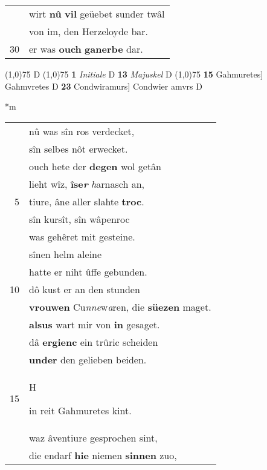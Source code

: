 \documentclass[8pt,a4paper,notitlepage]{article}
\begin{document}
\begin{table}[ht]
\begin{minipage}[t]{0.5\linewidth}
\begin{tabular}{rl}
 & wirt \textbf{nû} \textbf{vil} geüebet sunder twâl\\ 
 & von im, den Herzeloyde bar.\\ 
30 & er was \textbf{ouch} \textbf{ganerbe} dar.\\ 
\end{tabular}
\scriptsize
\line(1,0){75} \newline
D \newline
\line(1,0){75} \newline
\textbf{1} \textit{Initiale} D  \textbf{13} \textit{Majuskel} D  \newline
\line(1,0){75} \newline
\textbf{15} Gahmuretes] Gahmvretes D \textbf{23} Condwiramurs] Condwier amvrs D \newline
\end{minipage}
\hspace{0.5cm}
\begin{minipage}[t]{0.5\linewidth}
\small
\begin{center}*m
\end{center}
\begin{tabular}{rl}
 & nû was sîn ros verdecket,\\ 
 & sîn selbes nôt erwecket.\\ 
 & ouch hete der \textbf{degen} wol getân\\ 
 & lieht wîz, \textbf{îse\textit{r}} \textit{h}arnasch an,\\ 
5 & tiure, âne aller slahte \textbf{troc}.\\ 
 & sîn kursît, sîn wâpenroc\\ 
 & was gehêret mit gesteine.\\ 
 & sînen helm aleine\\ 
 & hatte er niht ûffe gebunden.\\ 
10 & dô kust er an den stunden\\ 
 & \textbf{vrouwen} Cu\textit{nne}w\textit{a}ren, die \textbf{süezen} maget.\\ 
 & \textbf{alsus} wart mir von \textbf{in} gesaget.\\ 
 & dâ \textbf{ergienc} ein trûric scheiden\\ 
 & \textbf{under} den gelieben beiden.\\ 
15 & \begin{large}H\end{large}in reit Gahmuretes kint.\\ 
 & waz âventiure gesprochen sint,\\ 
 & die endarf \textbf{hie} niemen \textbf{sinnen} zuo,\\ 

\end{tabular}
\end{minipage}
\end{table}
\end{document}

